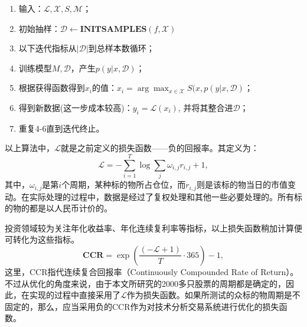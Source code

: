 \documentclass[twoside,longtitle]{LZUthesis}
\begin{document}
\begin{enumerate}
	\item 输入：$\mathcal{L},\mathcal{X}, S, \mathcal{M}$；
	\item 初始抽样：$\mathcal{D}\longleftarrow \mathbf{INIT SAMPLES}(f,\mathcal{X})$
	\item 以下迭代指标从$|\mathcal{D}|$到总样本数循环；
	\item 训练模型$M, \mathcal{D}$，产生$p(y|x,\mathcal{D})$；
	\item 根据获得函数得到$x_i$的值：$x_i=\arg\max_{x\in\mathcal{X}} S(x, p(y|x, \mathcal{D})$；
	\item 得到新数据(这一步成本较高)：$y_i=\mathcal{L}(x_i)$, 并将其整合进$\mathcal{D}$；
	\item 重复4-6直到迭代终止。
\end{enumerate}

以上算法中，$\mathcal{L}$就是之前定义的损失函数——负的回报率。其定义为：
\[
\mathcal{L}=-\sum_{i=1}^{T}\log \sum_j\omega_{i, j} r_{i,j}+1,
\]
其中，$\omega_{i, j}$是第$i$个周期，某种标的物所占仓位，而$r_{i,j}$则是该标的物当日的市值变动。在实际处理的过程中，数据是经过了复权处理和其他一些必要处理的。所有标的物的都是以人民币计价的。

投资领域较为关注年化收益率、年化连续复利率等指标，以上损失函数稍加计算便可转化为这些指标。
\[
\mathbf{CCR}=\exp\left(\frac{(\mathcal{-L}+1)}{T}\cdot 365\right)-1,
\]
这里，CCR指代连续复合回报率（Continuously Compounded Rate of Return）。不过从优化的角度来说，由于本文所研究的2000多只股票的周期都是确定的，因此，在实现的过程中直接采用了$\mathcal{L}$作为损失函数。如果所测试的众标的物周期是不固定的，那么，应当采用负的CCR作为对技术分析交易系统进行优化的损失函数。
\end{document}
